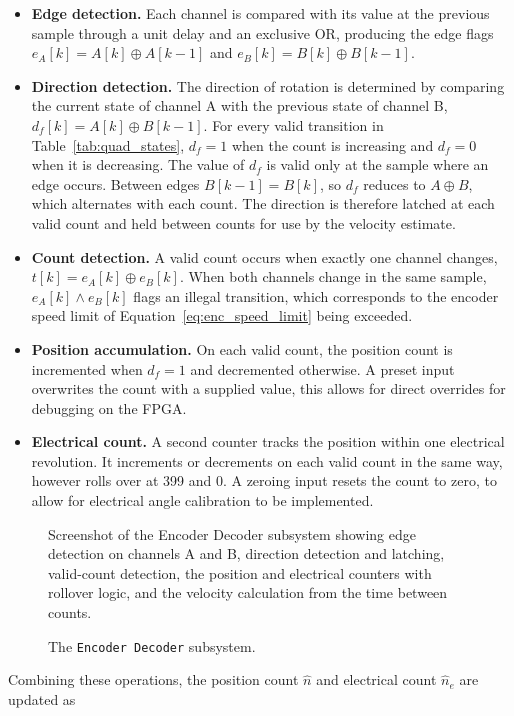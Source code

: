 \begin{itemize}
	\item \textbf{Edge detection.} Each channel is compared with its value at the previous sample through a unit delay and an exclusive OR, producing the edge flags $e_A[k] = A[k] \oplus A[k-1]$ and $e_B[k] = B[k] \oplus B[k-1]$.
	
	\item \textbf{Direction detection.} The direction of rotation is
	determined by comparing the current state of channel A with the previous state of channel B, $d_{f}[k] = A[k] \oplus B[k-1]$. For every valid transition in Table~\ref{tab:quad_states}, $d_f = 1$ when the count is increasing and $d_f = 0$ when it is decreasing. The value of $d_f$ is valid only at the sample where an edge occurs. Between edges $B[k-1] = B[k]$, so $d_f$ reduces to $A \oplus B$, which alternates with each count. The direction is therefore latched at each valid count and held between counts for use by the velocity estimate.
	
	\item \textbf{Count detection.} A valid count occurs when exactly one channel changes, $t[k] = e_A[k] \oplus e_B[k]$. When both channels change in the same sample, $e_A[k] \wedge e_B[k]$ flags an illegal transition, which corresponds to the encoder speed limit of Equation~\eqref{eq:enc_speed_limit} being exceeded.
	
	\item \textbf{Position accumulation.} On each valid count, the position count is incremented when $d_f = 1$ and decremented otherwise. A preset input overwrites the count with a supplied value, this allows for direct overrides for debugging on the FPGA.
	
	\item \textbf{Electrical count.} A second counter tracks the position within one electrical revolution. It increments or decrements on each valid count in the same way, however rolls over at 399 and 0. A zeroing input resets the count to zero, to allow for electrical angle calibration to be implemented. 
\end{itemize}

\begin{figure}[htbp]
	\centering
		{Screenshot of the Encoder Decoder subsystem showing edge detection on channels A and B, direction detection and latching, valid-count detection, the position and electrical counters with rollover logic, and the velocity calculation from the time between counts.}
	\caption[The Encoder Decoder subsystem]{The \texttt{Encoder Decoder} subsystem.}
	\label{fig:encoder_decoder}
\end{figure}
Combining these operations, the position count $\hat{n}$ and electrical count $\hat{n}_e$ are updated as


